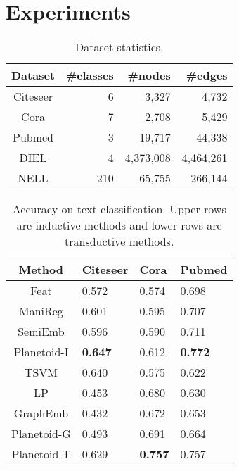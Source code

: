 
\section{Experiments}
\label{sec:exp}












\begin{table}[tb]
\caption{Dataset statistics.}
\label{tab:stat}
\vskip 0.15in
\begin{center}
\begin{small}
\begin{sc}
\begin{tabular}{crrr}
Dataset & \#classes & \#nodes & \#edges \\
\hline
\abovespace
Citeseer & 6 & 3,327 & 4,732 \\
Cora & 7 & 2,708 & 5,429 \\
Pubmed & 3 & 19,717 & 44,338 \\
DIEL & 4 & 4,373,008 & 4,464,261 \\
NELL & 210 & 65,755 & 266,144 \\
\end{tabular}
\end{sc}
\end{small}
\end{center}
\vskip -0.1in
\end{table}


\begin{table}[tb]
\caption{Accuracy on text classification. Upper rows are inductive methods and lower rows are transductive methods.}
\label{tab:text}
\vskip 0.15in
\begin{center}
\begin{small}
\begin{sc}
\begin{tabular}{clll}
Method & Citeseer & Cora & Pubmed \\
\hline
\abovespace
Feat & 0.572 & 0.574 & 0.698 \\
ManiReg & 0.601 & 0.595 & 0.707 \\
SemiEmb & 0.596 & 0.590 & 0.711 \\
Planetoid-I & \textbf{0.647} & 0.612 & \textbf{0.772} \\
\hline
\abovespace
TSVM & 0.640 & 0.575 & 0.622 \\
LP & 0.453 & 0.680 & 0.630 \\
GraphEmb & 0.432 & 0.672 & 0.653 \\
Planetoid-G & 0.493 & 0.691 & 0.664 \\
Planetoid-T & 0.629 & \textbf{0.757} & 0.757 \\
\end{tabular}
\end{sc}
\end{small}
\end{center}
\vskip -0.1in
\end{table}


